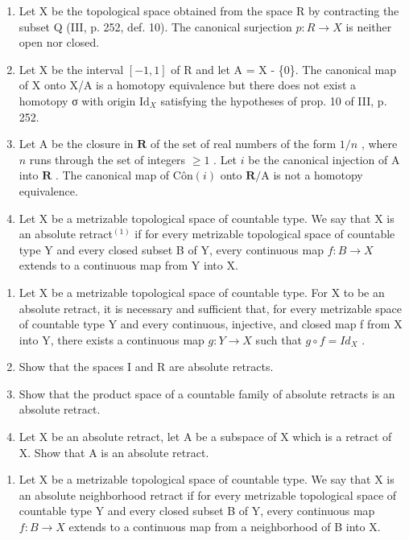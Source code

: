\begin{enumerate}
\def\labelenumi{\arabic{enumi})}
\setcounter{enumi}{2}
\item
  Let X be the topological space obtained from the space R by contracting the subset Q (III, p. 252, def. 10). The canonical surjection \(p: R \rightarrow X\) is neither open nor closed.
\item
  Let X be the interval \([-1,1]\) of R and let A = X - \{0\}. The canonical map of X onto X/A is a homotopy equivalence but there does not exist a homotopy σ with origin \(\mathrm{Id}_{X}\) satisfying the hypotheses of prop. 10 of III, p. 252.
\item
  Let A be the closure in \(\mathbf{R}\) of the set of real numbers of the form \(1/n\) , where \(n\) runs through the set of integers \(\geqslant 1\) . Let \(i\) be the canonical injection of A into \(\mathbf{R}\) . The canonical map of \(\mathrm{Côn}(i)\) onto \(\mathbf{R}/\mathrm{A}\) is not a homotopy equivalence.
\item
  Let X be a metrizable topological space of countable type. We say that X is an absolute retract\(^{(1)}\) if for every metrizable topological space of countable type Y and every closed subset B of Y, every continuous map \(f: B \to X\) extends to a continuous map from Y into X.
\end{enumerate}

\begin{enumerate}
\def\labelenumi{\alph{enumi})}
\item
  Let X be a metrizable topological space of countable type. For X to be an absolute retract, it is necessary and sufficient that, for every metrizable space of countable type Y and every continuous, injective, and closed map f from X into Y, there exists a continuous map \(g: Y \to X\) such that \(g \circ f = Id_{X}\) .
\item
  Show that the spaces I and R are absolute retracts.
\item
  Show that the product space of a countable family of absolute retracts is an absolute retract.
\item
  Let X be an absolute retract, let A be a subspace of X which is a retract of X. Show that A is an absolute retract.
\end{enumerate}

\begin{enumerate}
\def\labelenumi{\arabic{enumi})}
\setcounter{enumi}{6}
\tightlist
\item
  Let X be a metrizable topological space of countable type. We say that X is an absolute neighborhood retract if for every metrizable topological space of countable type Y and every closed subset B of Y, every continuous map \(f: B \rightarrow X\) extends to a continuous map from a neighborhood of B into X.
\end{enumerate}

